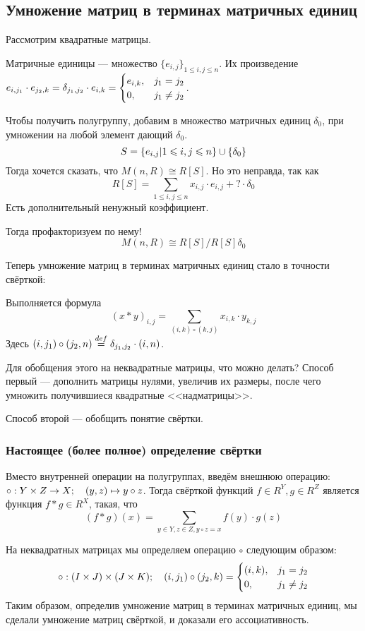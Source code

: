 \documentclass[a4paper]{report}
\begin{document}
    \subsection{Умножение матриц в терминах матричных единиц}
    Рассмотрим квадратные матрицы.

    Матричные единицы --- множество $\{e_{i,j}\}_{1 \le i, j \le n}$.
    Их произведение $e_{i,j_1} \cdot e_{j_2,k} = \delta_{j_1,j_2}\cdot e_{i,k} = \begin{cases}e_{i,k},&j_1 =j_2 \\ 0, &j_1 \ne j_2\end{cases}$.

    Чтобы получить полугруппу, добавим в множество матричных единиц $\delta_0$, при умножении на любой элемент дающий $\delta_0$.
    \[S = \left\{e_{i,j}\middle|1 \leqslant i, j \leqslant n\right\} \cup \{\delta_0\}\]
    Тогда хочется сказать, что $M(n, R) \cong R\left[S\right]$.
    Но это неправда, так как \[R[S] = \sum\limits_{1 \le i,j \le n}x_{i,j}\cdot e_{i,j} + ? \cdot \delta_0\]
    Есть дополнительный ненужный коэффициент.

    Тогда профакторизуем по нему!
    \[M(n, R) \cong R\left[S\right]/R\left[S\right]\delta_0\]

    Теперь умножение матриц в терминах матричных единиц стало в точности свёрткой:

    Выполняется формула \[(x * y)_{i,j} = \sum\limits_{(i, k) \circ (k, j)}x_{i,k}\cdot y_{k,j}\]
    Здесь $(i, j_1) \circ (j_2, n) \overset{def}{=} \delta_{j_{1},j_{2}} \cdot (i, n)$.

    Для обобщения этого на неквадратные матрицы, что можно делать?
    Способ первый --- дополнить матрицы нулями, увеличив их размеры, после чего умножить получившиеся квадратные <<надматрицы>>.

    Способ второй --- обобщить понятие свёртки.

    \subsubsection{Настоящее (более полное) определение свёртки}
    Вместо внутренней операции на полугруппах, введём внешнюю операцию: $\circ : Y \times Z \rightarrow X; \quad (y, z) \mapsto y \circ z$.
    Тогда свёрткой функций $f \in R^Y, g \in R^Z$ является функция $f * g \in R^X$, такая, что
    \[(f * g)(x) = \sum\limits_{y \in Y, z \in Z, y \circ z = x}f(y) \cdot g(z)\]

    На неквадратных матрицах мы определяем операцию $\circ$ следующим образом: \[\circ: (I \times J) \times (J \times K); \quad (i, j_1) \circ (j_2, k) = \begin{cases}(i,k),&j_1 = j_2\\0,& j_1 \ne j_2\end{cases}\]
    \label{associativity_of_matrix_product}
    Таким образом, определив умножение матриц в терминах матричных единиц, мы сделали умножение матриц свёрткой, и доказали его ассоциативность.
\end{document}
